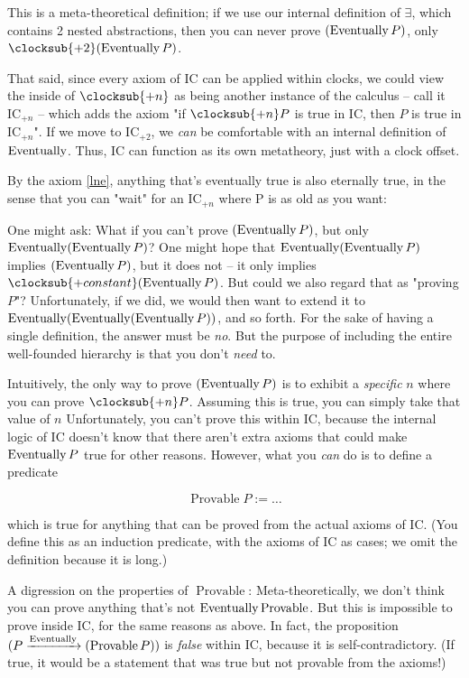 \documentclass{article}
\begin{document}
  This is a meta-theoretical definition; if we use our internal definition of $\exists$, which contains 2 nested abstractions, then you can never prove $(\operatorname{\mathrm{Eventually}} P)$, only $\clocksub{+2}(\eventually P)$.
  
  That said, since every axiom of IC can be applied within clocks, we could view the inside of $\clocksub{+n}$ as being another instance of the calculus – call it IC$_{+n}$ – which adds the axiom "if $\clocksub{+n} P$ is true in IC, then $P$ is true in IC$_{+n}$". If we move to IC$_{+2}$, we \emph{can} be comfortable with an internal definition of $\operatorname{\mathrm{Eventually}}$. Thus, IC can function as its own metatheory, just with a clock offset.
  
  By the axiom \eqref{lne}, anything that's eventually true is also eternally true, in the sense that you can "wait" for an IC$_{+n}$ where P is as old as you want:
  
  
  One might ask: What if you can't prove $(\operatorname{\mathrm{Eventually}} P)$, but only $\operatorname{\mathrm{Eventually}} (\operatorname{\mathrm{Eventually}} P)$? One might hope that $\operatorname{\mathrm{Eventually}} (\operatorname{\mathrm{Eventually}} P)$ implies $(\operatorname{\mathrm{Eventually}} P)$, but it does not – it only implies $\clocksub{+constant}(\eventually P)$. But could we also regard that as "proving $P$"? Unfortunately, if we did, we would then want to extend it to $\operatorname{\mathrm{Eventually}} (\operatorname{\mathrm{Eventually}} (\operatorname{\mathrm{Eventually}} P))$, and so forth. For the sake of having a single definition, the answer must be \emph{no}. But the purpose of including the entire well-founded hierarchy is that you don't \emph{need} to.
  
  Intuitively, the only way to prove $(\operatorname{\mathrm{Eventually}} P)$ is to exhibit a \emph{specific} $n$ where you can prove $\clocksub{+n} P$. Assuming this is true, you can simply take that value of $n$ Unfortunately, you can't prove this within IC, because the internal logic of IC doesn't know that there aren't extra axioms that could make $\operatorname{\mathrm{Eventually}} P$ true for other reasons. However, what you \emph{can} do is to define a predicate
  
  \newcommand{\provable}{\operatorname{\mathrm{Provable}}}
  
  \[\provable P := \dots\]
  
  which is true for anything that can be proved from the actual axioms of IC. (You define this as an induction predicate, with the axioms of IC as cases; we omit the definition because it is long.)
  
  A digression on the properties of $\provable$: Meta-theoretically, we don't think you can prove anything that's not $\eventually \provable$. But this is impossible to prove inside IC, for the same reasons as above. In fact, the proposition $(P \implies \eventually (\provable P))$ is \emph{false} within IC, because it is self-contradictory. (If true, it would be a statement that was true but not provable from the axioms!)
  
\end{document}
